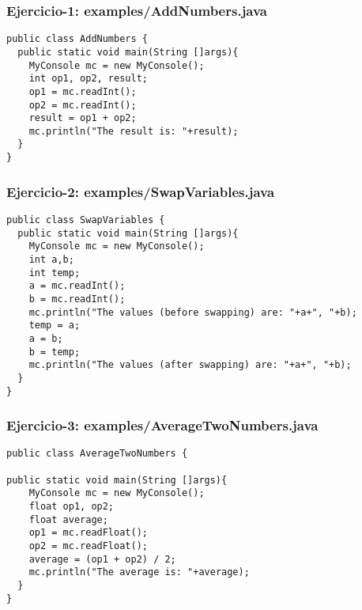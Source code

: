 \documentclass[xcolor=dvipsnames,dvip,notes=show,handout,table]{beamer}
\begin{document}
\begin{frame}[fragile]
\frametitle{Ejercicio-1: examples/AddNumbers.java}
\scriptsize
\begin{lstlisting}
public class AddNumbers {
  public static void main(String []args){
    MyConsole mc = new MyConsole();
    int op1, op2, result;
    op1 = mc.readInt();
    op2 = mc.readInt();
    result = op1 + op2;
    mc.println("The result is: "+result);
  }
}
\end{lstlisting}
\end{frame}




\begin{frame}[fragile]
\frametitle{Ejercicio-2: examples/SwapVariables.java}
\scriptsize
\begin{lstlisting}
public class SwapVariables {
  public static void main(String []args){
    MyConsole mc = new MyConsole();
    int a,b;
    int temp;
    a = mc.readInt();
    b = mc.readInt();
    mc.println("The values (before swapping) are: "+a+", "+b);
    temp = a;
    a = b;
    b = temp;
    mc.println("The values (after swapping) are: "+a+", "+b);
  }
}
\end{lstlisting}
\end{frame}





\begin{frame}[fragile]
\frametitle{Ejercicio-3: examples/AverageTwoNumbers.java}
\scriptsize
\begin{lstlisting}
public class AverageTwoNumbers {

public static void main(String []args){
    MyConsole mc = new MyConsole();
    float op1, op2;
    float average;
    op1 = mc.readFloat();
    op2 = mc.readFloat();
    average = (op1 + op2) / 2;
    mc.println("The average is: "+average);
  }
}
\end{lstlisting}
\end{frame}
\end{document}
